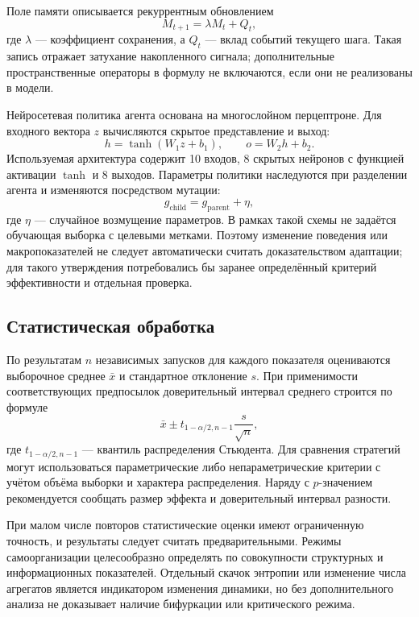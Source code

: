 \documentclass{misisarticle}
\begin{document}
Поле памяти описывается рекуррентным обновлением
\begin{equation}
  M_{t+1}=\lambda M_t+Q_t,
  \label{eq:memory}
\end{equation}
где $\lambda$ — коэффициент сохранения, а $Q_t$ — вклад событий текущего шага. Такая запись отражает затухание накопленного сигнала; дополнительные пространственные операторы в формулу не включаются, если они не реализованы в модели.

Нейросетевая политика агента основана на многослойном перцептроне. Для входного вектора $z$ вычисляются скрытое представление и выход:
\begin{equation}
  h=\tanh(W_1z+b_1),\qquad o=W_2h+b_2.
  \label{eq:mlp}
\end{equation}
Используемая архитектура содержит 10 входов, 8 скрытых нейронов с функцией активации $\tanh$ и 8 выходов. Параметры политики наследуются при разделении агента и изменяются посредством мутации:
\begin{equation}
  g_{\mathrm{child}}=g_{\mathrm{parent}}+\eta,
  \label{eq:mutation}
\end{equation}
где $\eta$ — случайное возмущение параметров. В рамках такой схемы не задаётся обучающая выборка с целевыми метками. Поэтому изменение поведения или макропоказателей не следует автоматически считать доказательством адаптации; для такого утверждения потребовались бы заранее определённый критерий эффективности и отдельная проверка.

\subsection{Статистическая обработка}

По результатам $n$ независимых запусков для каждого показателя оцениваются выборочное среднее $\bar{x}$ и стандартное отклонение $s$. При применимости соответствующих предпосылок доверительный интервал среднего строится по формуле
\begin{equation}
  \bar{x}\pm t_{1-\alpha/2,n-1}\frac{s}{\sqrt{n}},
  \label{eq:ci}
\end{equation}
где $t_{1-\alpha/2,n-1}$ — квантиль распределения Стьюдента. Для сравнения стратегий могут использоваться параметрические либо непараметрические критерии с учётом объёма выборки и характера распределения. Наряду с $p$-значением рекомендуется сообщать размер эффекта и доверительный интервал разности.

При малом числе повторов статистические оценки имеют ограниченную точность, и результаты следует считать предварительными. Режимы самоорганизации целесообразно определять по совокупности структурных и информационных показателей. Отдельный скачок энтропии или изменение числа агрегатов является индикатором изменения динамики, но без дополнительного анализа не доказывает наличие бифуркации или критического режима.
\end{document}

